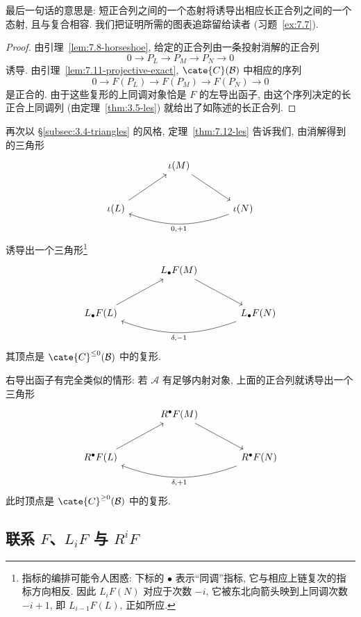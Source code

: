 最后一句话的意思是: 短正合列之间的一个态射将诱导出相应长正合列之间的一个态射, 且与复合相容. 我们把证明所需的图表追踪留给读者 (习题~\ref{ex:7.7}).

\begin{proof}
由引理~\ref{lem:7.8-horseshoe}, 给定的正合列由一条投射消解的正合列
\[
0\to P_L\to P_M\to P_N\to 0
\]
诱导. 由引理~\ref{lem:7.11-projective-exact}, $\cate{C}(\mathcal{B})$ 中相应的序列
\[
0\to F(P_L)\to F(P_M)\to F(P_N)\to 0
\]
是正合的. 由于这些复形的上同调对象恰是 $F$ 的左导出函子, 由这个序列决定的长正合上同调列 (由定理~\ref{thm:3.5-les}) 就给出了如陈述的长正合列.
\end{proof}

再次以 \S\ref{subsec:3.4-triangles} 的风格, 定理~\ref{thm:7.12-les} 告诉我们, 由消解得到的三角形
\[
\begin{tikzcd}[ampersand replacement=\&,column sep=large,row sep=large]
\&\iota(M)\ar[dr]\&\\
\iota(L)\ar[ur]\&\&\iota(N)\ar[ll,bend left=20,"{0,+1}"]
\end{tikzcd}
\]
诱导出一个三角形\footnote{指标的编排可能令人困惑: 下标的 $\bullet$ 表示``同调''指标, 它与相应上链复次的指标方向相反. 因此 $L_i F(N)$ 对应于次数 $-i$, 它被东北向箭头映到上同调次数 $-i+1$, 即 $L_{i-1} F(L)$, 正如所应.}
\[
\begin{tikzcd}[ampersand replacement=\&,column sep=large,row sep=large]
\&L_\bullet F(M)\ar[dr]\&\\
L_\bullet F(L)\ar[ur]\&\&L_\bullet F(N)\ar[ll,bend left=20,"{\delta,-1}"]
\end{tikzcd}
\]
其顶点是 $\cate{C}^{\le0}(\mathcal{B})$ 中的复形.

右导出函子有完全类似的情形: 若 $\mathcal{A}$ 有足够内射对象, 上面的正合列就诱导出一个三角形
\[
\begin{tikzcd}[ampersand replacement=\&,column sep=large,row sep=large]
\&R^\bullet F(M)\ar[dr]\&\\
R^\bullet F(L)\ar[ur]\&\&R^\bullet F(N)\ar[ll,bend left=20,"{\delta,+1}"]
\end{tikzcd}
\]
此时顶点是 $\cate{C}^{\ge0}(\mathcal{B})$ 中的复形.

\subsection{联系 \texorpdfstring{$F$}{F}、\texorpdfstring{$L_i F$}{Li F} 与 \texorpdfstring{$R^i F$}{Ri F}}
\label{subsec:7.5-relate}

